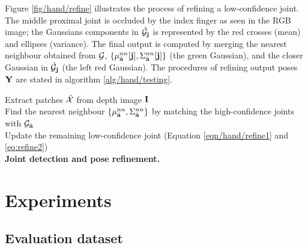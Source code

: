 Figure \ref{fig/hand/refine} illustrates the process of refining a low-confidence joint. The middle proximal joint is occluded by the index finger as seen in the RGB image; the Gaussians components in $\hat{\mathcal{G}}_{\mathbf{j}}$ is represented by the red crosses (mean) and ellipses (variance). The final output is computed by merging the nearest neighbour obtained from $\mathcal{G}$, \ie $\{\mu_{\hat{\mathbf{a}}}^{nn}[\mathbf{j}], \Sigma_{\hat{\mathbf{a}}}^{nn}[\mathbf{j}]\}$ (the green Gaussian), and the closer Gaussian in $\hat{\mathcal{G}}_{\mathbf{j}}$ (the left red Gaussian).  
The procedures of refining output poses $\mathbf{Y}$ are stated in algorithm \ref{alg/hand/testing}.  

\begin{algorithm}
	Extract patches $\hat{\mathcal{X}}$ from depth image $\mathbf{I}$ \\ 
	Find the nearest neighbour $\{\mu_{\hat{\mathbf{a}}}^{nn},\Sigma_{\hat{\mathbf{a}}}^{nn}\}$ by matching the high-confidence joints with $\mathcal{G}_{\hat{\mathbf{a}}}$\\ 
	Update the remaining low-confidence joint (Equation \ref{eqn/hand/refine1} and \ref{eq:refine2}) \\
	\caption{\textbf{Joint detection and pose refinement.}} 
	\label{alg/hand/testing}
\end{algorithm}

\section{Experiments}

\subsection{Evaluation dataset} 

